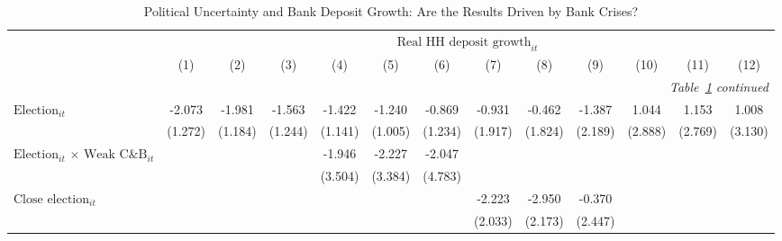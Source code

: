 \begin{longtable}{m{5cm}*{12}{c}}                                         \caption{Political Uncertainty and Bank Deposit Growth: Are the Results Driven by Bank Crises?\label{robustcrises2}}\\                                         \toprule                                         &\multicolumn{12}{c}{$\text{Real HH deposit growth}_{it}$} \\ \cmidrule(lr){2-13}
                    &         (1)   &         (2)   &         (3)   &         (4)   &         (5)   &         (6)   &         (7)   &         (8)   &         (9)   &        (10)   &        (11)   &        (12)   \\
\midrule\endfirsthead                                         \multicolumn{13}{r}{\textit{Table~\ref{robustcrises2} continued}} \\                                         \toprule\endhead\midrule\endfoot\endlastfoot
$\text{Election}_{it}$&      -2.073   &      -1.981   &      -1.563   &      -1.422   &      -1.240   &      -0.869   &      -0.931   &      -0.462   &      -1.387   &       1.044   &       1.153   &       1.008   \\
                    &     (1.272)   &     (1.184)   &     (1.244)   &     (1.141)   &     (1.005)   &     (1.234)   &     (1.917)   &     (1.824)   &     (2.189)   &     (2.888)   &     (2.769)   &     (3.130)   \\
\multirow{2}{5cm}{$\text{Election}_{it}$ $\times$ $\text{Weak C\&B}_{it}$}&               &               &               &      -1.946   &      -2.227   &      -2.047   &               &               &               &               &               &               \\
                    &               &               &               &     (3.504)   &     (3.384)   &     (4.783)   &               &               &               &               &               &               \\
\multirow{2}{5cm}{$\text{Close election}_{it}$}&               &               &               &               &               &               &      -2.223   &      -2.950   &      -0.370   &               &               &               \\
                    &               &               &               &               &               &               &     (2.033)   &     (2.173)   &     (2.447)   &               &               &               \\

\end{longtable}
